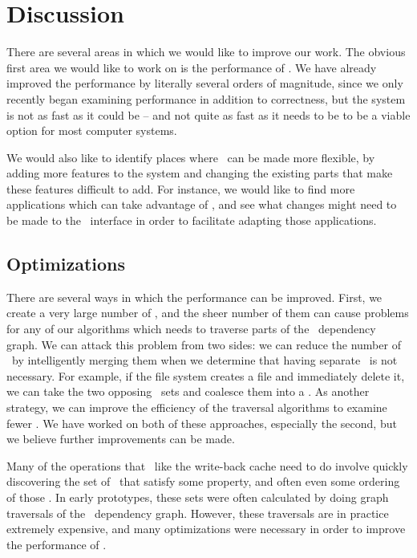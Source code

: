 \section {Discussion}
\label{sec:discussion}

There are several areas in which we would like to improve our work. The obvious
first area we would like to work on is the performance of \Kudos. We have
already improved the performance by literally several orders of magnitude, since
we only recently began examining performance in addition to correctness, but the
system is not as fast as it could be -- and not quite as fast as it needs to be
to be a viable option for most computer systems.

We would also like to identify places where \Kudos\ can be made more flexible,
by adding more features to the system and changing the existing parts that make
these features difficult to add. For instance, we would like to find more
applications which can take advantage of \opgroups, and see what changes might
need to be made to the \opgroup\ interface in order to facilitate adapting those
applications.

\subsection {Optimizations}
There are several ways in which the performance can be improved. First, we
create a very large number of \chdescs, and the sheer number of them can cause
problems for any of our algorithms which needs to traverse parts of the \chdesc\
dependency graph. We can attack this problem from two sides: we can reduce the
number of \chdescs\ by intelligently merging them when we determine that having
separate \chdescs\ is not necessary. For example, if the file system creates a
file and immediately delete it, we can take the two opposing \chdescs\ sets and
coalesce them into a \noop. As another strategy, we can improve the efficiency
of the traversal algorithms to examine fewer \chdescs. We have worked on both
of these approaches, especially the second, but we believe further improvements
can be made.

Many of the operations that \modules\ like the write-back cache need to do
involve quickly discovering the set of \chdescs\ that satisfy some property, and
often even some ordering of those \chdescs. In early prototypes, these sets were
often calculated by doing graph traversals of the \chdesc\ dependency graph.
However, these traversals are in practice extremely expensive, and many
optimizations were necessary in order to improve the performance of \Kudos.

